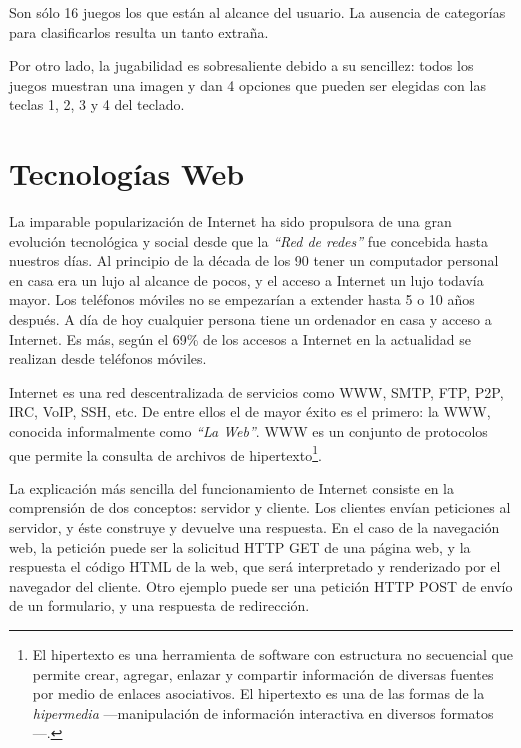 Son sólo 16 juegos los que están al alcance del usuario. La ausencia de categorías para clasificarlos resulta un tanto extraña.

Por otro lado, la jugabilidad es sobresaliente debido a su sencillez: todos los juegos muestran una imagen y dan 4 opciones que pueden ser elegidas con las teclas 1, 2, 3 y 4 del teclado.

\section{Tecnologías Web}
\label{sec::desarrollo-web}

La imparable popularización de Internet ha sido propulsora de una gran evolución tecnológica y social desde que la {\it ``Red de redes''} fue concebida hasta nuestros días. Al principio de la década de los 90 tener un computador personal en casa era un lujo al alcance de pocos, y el acceso a Internet un lujo todavía mayor. Los teléfonos móviles no se empezarían a extender hasta 5 o 10 años después. A día de hoy cualquier persona tiene un ordenador en casa y acceso a Internet. Es más, según \cite{Accenture2012} el 69\% de los accesos a Internet en la actualidad se realizan desde teléfonos móviles.

Internet es una red descentralizada de servicios como \acs{WWW}, \acs{SMTP}, \acs{FTP}, \acs{P2P}, \acs{IRC}, \acs{VoIP}, \acs{SSH}, etc. De entre ellos el de mayor éxito es el primero: la \acf{WWW}, conocida informalmente como {\it ``La Web''}. \acs{WWW} es un conjunto de protocolos que permite la consulta de archivos de hipertexto\footnote{El hipertexto es una herramienta de software con estructura no secuencial que permite crear, agregar, enlazar y compartir información de diversas fuentes por medio de enlaces asociativos. El hipertexto es una de las formas de la {\it hipermedia} ---manipulación de información interactiva en diversos formatos---.}.

La explicación más sencilla del funcionamiento de Internet consiste en la comprensión de dos conceptos: servidor y cliente. Los clientes envían peticiones al servidor, y éste construye y devuelve una respuesta. En el caso de la navegación web, la petición puede ser la solicitud \acs{HTTP} \acs{GET} de una página web, y la respuesta el código \acs{HTML} de la web, que será interpretado y renderizado por el navegador del cliente. Otro ejemplo puede ser una petición \acs{HTTP} \acs{POST} de envío de un formulario, y una respuesta de redirección.

